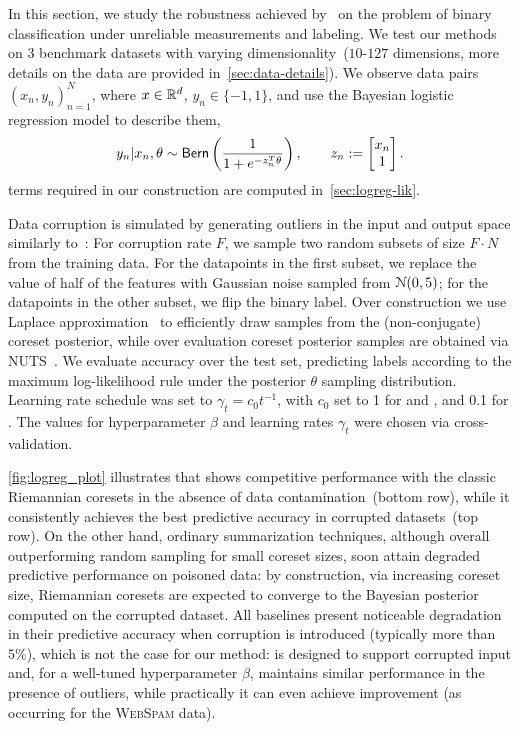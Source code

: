 In this section, we study the robustness achieved by~\bcores{} on the problem of binary classification  under unreliable measurements and labeling. We test our methods on 3 benchmark datasets with varying dimensionality~($10$-$127$ dimensions, more details on the data are provided in~\cref{sec:data-details}). We observe data pairs $(x_n, y_n)_{n=1}^{N}$, where $x\in\mathbb{R}^{d}$, $y_n \in \{-1,1\}$, and use the Bayesian logistic regression model to describe them,
\[
y_n | x_n, \theta \sim {\sf{Bern}} \left( \frac{1}{1+e^{-z_n^T \theta}}\right),
\qquad 
z_n:=\begin{bmatrix}
x_n \\
1
\end{bmatrix}.
\]
\blik{} terms required in our construction are computed in~\cref{sec:logreg-lik}. 

Data corruption is simulated by generating outliers in the input and output space similarly to~\cite{futami18}: For corruption rate $F$, we sample two random subsets of size $F\cdot N$ from the training data.  For the datapoints in the first subset, we replace the value of half of the features with Gaussian noise sampled \iid from $\mathcal{N}(0,5)$; for the datapoints in the other subset, we flip the binary label. Over construction we use Laplace approximation~\citep{mackay03} to efficiently draw samples from the (non-conjugate) coreset posterior, while over evaluation coreset posterior samples are obtained via NUTS~\citep{hoffman14}. We evaluate accuracy over the test set, predicting labels according to the maximum log-likelihood rule under the posterior $\theta$ sampling distribution. Learning rate schedule was set to $\gamma_t=c_0 t^{-1}$, with $c_0$ set to 1 for \sparsevi{} and \bcores{}, and 0.1 for \psvi. %
The values for hyperparameter $\beta$ and learning rates $\gamma_t$ were chosen via cross-validation. 

\cref{fig:logreg_plot} illustrates that \bcores{} shows competitive performance with the classic Riemannian coresets in the absence of data contamination~(bottom row), while it consistently achieves the best predictive accuracy in corrupted datasets~(top row).  On the other hand, ordinary summarization techniques, although overall outperforming random sampling for small coreset sizes, soon attain degraded predictive performance on poisoned data: by construction, via increasing coreset size, Riemannian coresets are expected to converge to the Bayesian posterior computed on the corrupted dataset. All baselines present noticeable degradation in their predictive accuracy when corruption is introduced (typically more than $5\%$), which is not the case for our method: \bcores{} is designed to support corrupted input and, for a well-tuned hyperparameter $\beta$, maintains similar performance in the presence of outliers, while practically it can even achieve improvement (as occurring for the \textsc{WebSpam} data).


